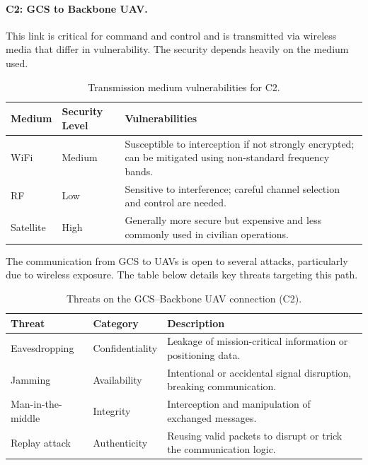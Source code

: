 \paragraph{C2: GCS to Backbone UAV.}

This link is critical for command and control and is transmitted via wireless media that differ in vulnerability. The security depends heavily on the medium used.

\begin{table}[H]
\renewcommand{\arraystretch}{1.3}
\centering
\caption{Transmission medium vulnerabilities for C2.}
\begin{tabular}{|>{\centering\arraybackslash}m{3.5cm}|
                >{\centering\arraybackslash}m{2.5cm}|
                >{\arraybackslash}m{7.5cm}|}
\hline
\textbf{Medium} & \textbf{Security Level} & \textbf{Vulnerabilities} \\
\hline
WiFi & Medium & Susceptible to interception if not strongly encrypted; can be mitigated using non-standard frequency bands. \\
\hline
RF & Low & Sensitive to interference; careful channel selection and control are needed. \\
\hline
Satellite & High & Generally more secure but expensive and less commonly used in civilian operations. \\
\hline
\end{tabular}
\label{tab:c2_mediums}
\end{table}

\vspace{1em}

The communication from GCS to UAVs is open to several attacks, particularly due to wireless exposure. The table below details key threats targeting this path.

\begin{table}[H]
\renewcommand{\arraystretch}{1.3}
\centering
\caption{Threats on the GCS–Backbone UAV connection (C2).}
\begin{tabular}{|>{\centering\arraybackslash}m{3.5cm}|
                >{\centering\arraybackslash}m{2.5cm}|
                >{\arraybackslash}m{7.5cm}|}
\hline
\textbf{Threat} & \textbf{Category} & \textbf{Description} \\
\hline
Eavesdropping & Confidentiality & Leakage of mission-critical information or positioning data. \\
\hline
Jamming & Availability & Intentional or accidental signal disruption, breaking communication. \\
\hline
Man-in-the-middle & Integrity & Interception and manipulation of exchanged messages. \\
\hline
Replay attack & Authenticity & Reusing valid packets to disrupt or trick the communication logic. \\
\hline
\end{tabular}
\label{tab:c2_threats}
\end{table}

